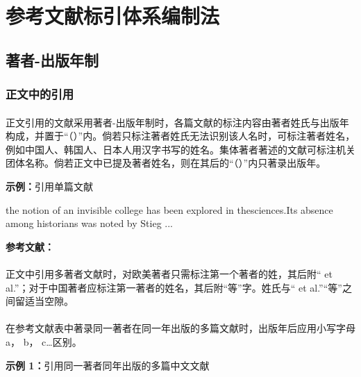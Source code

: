 \documentclass{article}
\newlength{\indentedpara}
\begin{document}
\setlength{\indentedpara}{\linewidth-2em}
\appendix
\section{参考文献标引体系编制法}
\subsection{著者-出版年制}
\subsubsection{正文中的引用}
\paragraph{} 正文引用的文献采用著者-出版年制时，各篇文献的标注内容由著者姓氏与出版年构成，并置于“（）”内。倘若只标注著者姓氏无法识别该人名时，可标注著者姓名，例如中国人、韩国人、日本人用汉字书写的姓名。集体著者著述的文献可标注机关团体名称。倘若正文中已提及著者姓名，则在其后的“（）”内只著录出版年。

\begin{refsection}
\textbf{示例：}引用单篇文献

the notion of an invisible college has been explored in thesciences\cite{CRANE1972--}.Its absence among historians was noted by Stieg ...

\textbf{参考文献：}

\parbox{2em}{}\parbox{\indentedpara}{\printbibliography[heading=none]}
\end{refsection}

\paragraph{} 正文中引用多著者文献时，对欧美著者只需标注第一个著者的姓，其后附“ et al.”；对于中国著者应标注第一著者的姓名，其后附“等”字。姓氏与“ et al.”“等”之间留适当空隙。

\paragraph{} 在参考文献表中著录同一著者在同一年出版的多篇文献时，出版年后应用小写字母 a， b， c…区别。

\begin{refsection}
\textbf{示例 1：}引用同一著者同年出版的多篇中文文献
\nocite{贾君枝2023编目,贾君枝2023短评}

\parbox{2em}{}\parbox{\indentedpara}{\printbibliography[heading=none]}
\end{refsection}
\end{document}
